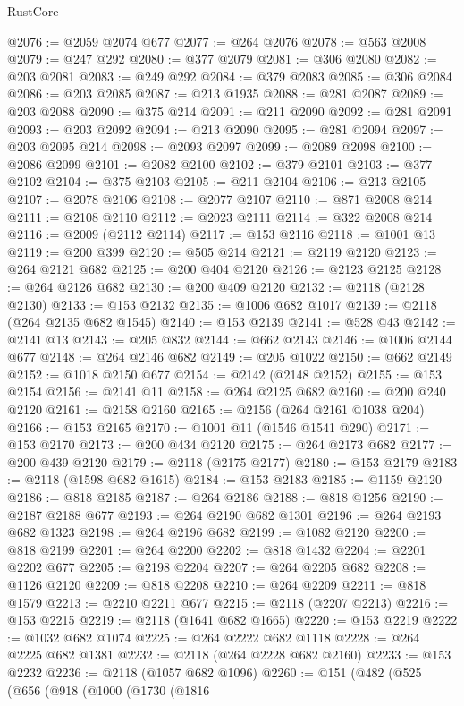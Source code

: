 \begin{lexlean}{RustCore}
\begin{coremodule}
@2076 := @2059 @2074 @677
@2077 := @264 @2076
@2078 := @563 @2008
@2079 := @247 @292
@2080 := @377 @2079
@2081 := @306 @2080
@2082 := @203 @2081
@2083 := @249 @292
@2084 := @379 @2083
@2085 := @306 @2084
@2086 := @203 @2085
@2087 := @213 @1935
@2088 := @281 @2087
@2089 := @203 @2088
@2090 := @375 @214
@2091 := @211 @2090
@2092 := @281 @2091
@2093 := @203 @2092
@2094 := @213 @2090
@2095 := @281 @2094
@2097 := @203 @2095 @214
@2098 := @2093 @2097
@2099 := @2089 @2098
@2100 := @2086 @2099
@2101 := @2082 @2100
@2102 := @379 @2101
@2103 := @377 @2102
@2104 := @375 @2103
@2105 := @211 @2104
@2106 := @213 @2105
@2107 := @2078 @2106
@2108 := @2077 @2107
@2110 := @871 @2008 @214
@2111 := @2108 @2110
@2112 := @2023 @2111
@2114 := @322 @2008 @214
@2116 := @2009 (@2112 @2114)
@2117 := @153 @2116
@2118 := @1001 @13
@2119 := @200 @399
@2120 := @505 @214
@2121 := @2119 @2120
@2123 := @264 @2121 @682
@2125 := @200 @404 @2120
@2126 := @2123 @2125
@2128 := @264 @2126 @682
@2130 := @200 @409 @2120
@2132 := @2118 (@2128 @2130)
@2133 := @153 @2132
@2135 := @1006 @682 @1017
@2139 := @2118 (@264 @2135 @682 @1545)
@2140 := @153 @2139
@2141 := @528 @43
@2142 := @2141 @13
@2143 := @205 @832
@2144 := @662 @2143
@2146 := @1006 @2144 @677
@2148 := @264 @2146 @682
@2149 := @205 @1022
@2150 := @662 @2149
@2152 := @1018 @2150 @677
@2154 := @2142 (@2148 @2152)
@2155 := @153 @2154
@2156 := @2141 @11
@2158 := @264 @2125 @682
@2160 := @200 @240 @2120
@2161 := @2158 @2160
@2165 := @2156 (@264 @2161 @1038 @204)
@2166 := @153 @2165
@2170 := @1001 @11 (@1546 @1541 @290)
@2171 := @153 @2170
@2173 := @200 @434 @2120
@2175 := @264 @2173 @682
@2177 := @200 @439 @2120
@2179 := @2118 (@2175 @2177)
@2180 := @153 @2179
@2183 := @2118 (@1598 @682 @1615)
@2184 := @153 @2183
@2185 := @1159 @2120
@2186 := @818 @2185
@2187 := @264 @2186
@2188 := @818 @1256
@2190 := @2187 @2188 @677
@2193 := @264 @2190 @682 @1301
@2196 := @264 @2193 @682 @1323
@2198 := @264 @2196 @682
@2199 := @1082 @2120
@2200 := @818 @2199
@2201 := @264 @2200
@2202 := @818 @1432
@2204 := @2201 @2202 @677
@2205 := @2198 @2204
@2207 := @264 @2205 @682
@2208 := @1126 @2120
@2209 := @818 @2208
@2210 := @264 @2209
@2211 := @818 @1579
@2213 := @2210 @2211 @677
@2215 := @2118 (@2207 @2213)
@2216 := @153 @2215
@2219 := @2118 (@1641 @682 @1665)
@2220 := @153 @2219
@2222 := @1032 @682 @1074
@2225 := @264 @2222 @682 @1118
@2228 := @264 @2225 @682 @1381
@2232 := @2118 (@264 @2228 @682 @2160)
@2233 := @153 @2232
@2236 := @2118 (@1057 @682 @1096)
@2260 := @151
    (@482
      (@525
        (@656
          (@918
            (@1000
              (@1730
                (@1816

\end{coremodule}
\end{lexlean}

